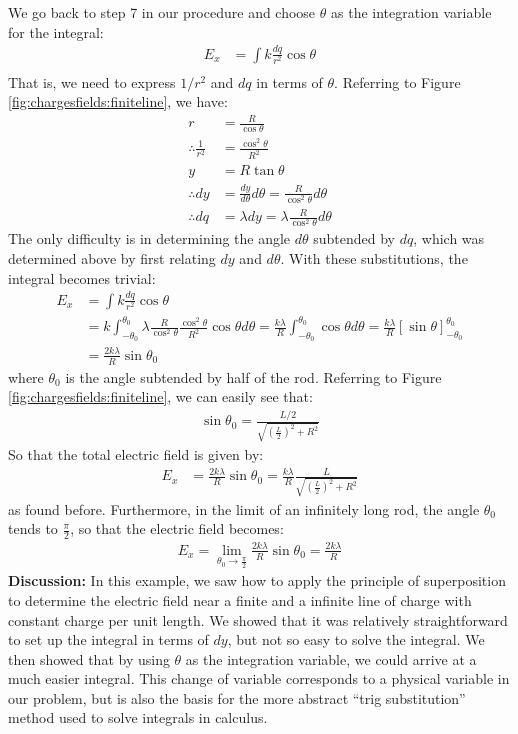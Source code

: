 \begin{example}
We go back to step 7 in our procedure and choose $\theta$ as the integration variable for the integral:
\begin{align*}
E_x &=\int k\frac{dq}{r^2}\cos\theta\\
\end{align*}
That is, we need to express $1/r^2$ and $dq$ in terms of $\theta$. Referring to Figure \ref{fig:chargesfields:finiteline}, we have:
\begin{align*}
r &= \frac{R}{\cos\theta}\\
\therefore \frac{1}{r^2}&=\frac{\cos^2\theta}{R^2}\\
y &= R\tan\theta\\
\therefore dy &= \frac{dy}{d\theta}d\theta=\frac{R}{\cos^2\theta}d\theta\\
\therefore dq &= \lambda dy =\lambda\frac{R}{\cos^2\theta}d\theta
\end{align*}
The only difficulty is in determining the angle $d\theta$ subtended by $dq$, which was determined above by first relating $dy$ and $d\theta$. With these substitutions, the integral becomes trivial:
\begin{align*}
E_x &=\int k\frac{dq}{r^2}\cos\theta\\
&=k\int_{-\theta_0}^{\theta_0} \lambda\frac{R}{\cos^2\theta} \frac{\cos^2\theta}{R^2} \cos\theta d\theta=\frac{k\lambda}{R}\int_{-\theta_0}^{\theta_0}\cos\theta d\theta=\frac{k\lambda}{R}\left[\sin\theta \right]_{-\theta_0}^{\theta_0}\\
&=\frac{2k\lambda}{R}\sin\theta_0
\end{align*}
where $\theta_0$ is the angle subtended by half of the rod. Referring to Figure \ref{fig:chargesfields:finiteline}, we can easily see that:
\begin{align*}
\sin\theta_0=\frac{L/2}{\sqrt{\left(\frac{L}{2}\right)^2+R^2}}
\end{align*}
So that the total electric field is given by:
\begin{align*}
E_x &=\frac{2k\lambda}{R}\sin\theta_0=\frac{k\lambda}{R}\frac{L}{\sqrt{\left(\frac{L}{2}\right)^2+R^2}}
\end{align*}
as found before. Furthermore, in the limit of an infinitely long rod, the angle $\theta_0$ tends to $\frac{\pi}{2}$, so that the electric field becomes:
\begin{align*}
E_x=\lim_{\theta_0\to\frac{\pi}{2}}\frac{2k\lambda}{R}\sin\theta_0=\frac{2k\lambda}{R}
\end{align*}
\textbf{Discussion:} In this example, we saw how to apply the principle of superposition to determine the electric field near a finite and a infinite line of charge with constant charge per unit length. We showed that it was relatively straightforward to set up the integral in terms of $dy$, but not so easy to solve the integral. We then showed that by using $\theta$ as the integration variable, we could arrive at a much easier integral. This change of variable corresponds to a physical variable in our problem, but is also the basis for the more abstract ``trig substitution'' method used to solve integrals in calculus.
\end{example}

